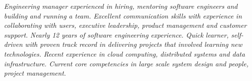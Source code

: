 {\selectfont
\textit{Engineering manager experienced in hiring, mentoring software engineers and building and running a team. Excellent communication skills with experience in collaborating with users, executive leadership, product management and customer support. Nearly 12 years of software engineering experience. Quick learner, self-driven with proven track record in delivering projects that involved learning new technologies. Recent experience in cloud computing, distributed systems and data infrastructure. Current core competencies in large scale system design and people, project management.}
}